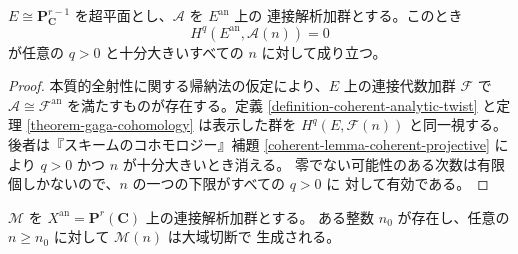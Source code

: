 \begin{lemma}
\label{lemma-hyperplane-analytic-serre-vanishing}
$E\cong\mathbf P^{r-1}_{\mathbf C}$ を超平面とし、$\mathcal A$ を $E^{\mathrm{an}}$ 上の
連接解析加群とする。このとき
$$
H^q(E^{\mathrm{an}},\mathcal A(n))=0
$$
が任意の $q>0$ と十分大きいすべての $n$ に対して成り立つ。
\end{lemma}

\begin{proof}
本質的全射性に関する帰納法の仮定により、$E$ 上の連接代数加群 $\mathcal F$ で
$\mathcal A\cong\mathcal F^{\mathrm{an}}$ を満たすものが存在する。定義
\ref{definition-coherent-analytic-twist} と定理 \ref{theorem-gaga-cohomology} は表示した群を
$H^q(E,\mathcal F(n))$ と同一視する。後者は『スキームのコホモロジー』補題
\ref{coherent-lemma-coherent-projective} により $q>0$ かつ $n$ が十分大きいとき消える。
零でない可能性のある次数は有限個しかないので、$n$ の一つの下限がすべての $q>0$ に
対して有効である。
\end{proof}

\begin{lemma}
\label{lemma-projective-analytic-global-generation}
$\mathcal M$ を $X^{\mathrm{an}}=\mathbf P^r(\mathbf C)$ 上の連接解析加群とする。
ある整数 $n_0$ が存在し、任意の $n\geq n_0$ に対して $\mathcal M(n)$ は大域切断で
生成される。
\end{lemma}

